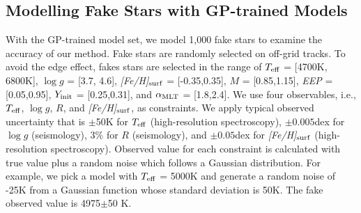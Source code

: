 \subsection{Modelling Fake Stars with GP-trained Models}

With the GP-trained model set, we model 1,000 fake stars to examine the accuracy of our method. Fake stars are randomly selected on off-grid tracks. To avoid the edge effect, fakes stars are selected in the range of $T_{\rm eff}$ = [4700K, 6800K], $\log g$ = [3.7, 4.6], {\it [Fe/H]}$_{\rm surf}$ = [-0.35,0.35], $M$ = [0.85,1.15], {\it EEP} = [0.05,0.95], $Y_{\rm init}$ = [0.25,0.31], and $\alpha_{\rm MLT}$ = [1.8,2.4].  
%
We use four observables, i.e., $T_{\rm eff}$, $\log g$, $R$, and {\it [Fe/H]}$_{\rm surf}$, as constraints. We apply typical observed uncertainty that is $\pm$50K for $T_{\rm eff}$ (high-resolution spectroscopy), $\pm0.005$dex for $\log g$ (seismology), $3\%$ for $R$ (seismology), and $\pm0.05$dex for {\it [Fe/H]}$_{\rm surf}$ (high-resolution spectroscopy). Observed value for each constraint is calculated with true value plus a random noise which follows a Gaussian distribution. For example, we pick a model with $T_{\rm eff}$ = 5000K and generate a random noise of -25K from a Gaussian function whose standard deviation is 50K. The fake observed value is 4975$\pm$50 K.  


